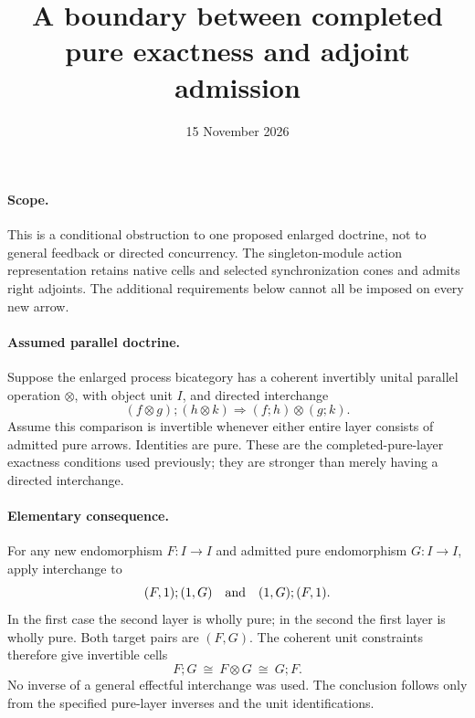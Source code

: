 \documentclass{article}
\title{A boundary between completed pure exactness and adjoint admission}
\date{15 November 2026}
\begin{document}
\maketitle
\paragraph{Scope.} This is a conditional obstruction to one proposed enlarged doctrine, not to general feedback or directed concurrency. The singleton-module action representation retains native cells and selected synchronization cones and admits right adjoints. The additional requirements below cannot all be imposed on every new arrow.

\paragraph{Assumed parallel doctrine.} Suppose the enlarged process bicategory has a coherent invertibly unital parallel operation $\otimes$, with object unit $I$, and directed interchange
\[
 (f\otimes g);(h\otimes k)\Longrightarrow(f;h)\otimes(g;k).
\]
Assume this comparison is invertible whenever either entire layer consists of admitted pure arrows. Identities are pure. These are the completed-pure-layer exactness conditions used previously; they are stronger than merely having a directed interchange.

\paragraph{Elementary consequence.} For any new endomorphism $F:I\to I$ and admitted pure endomorphism $G:I\to I$, apply interchange to
\[
 (F,1);(1,G)\quad\hbox{and}\quad(1,G);(F,1).
\]
In the first case the second layer is wholly pure; in the second the first layer is wholly pure. Both target pairs are $(F,G)$. The coherent unit constraints therefore give invertible cells
\[
 F;G\ \cong\ F\otimes G\ \cong\ G;F.
\]
No inverse of a general effectful interchange was used. The conclusion follows only from the specified pure-layer inverses and the unit identifications.
\end{document}
